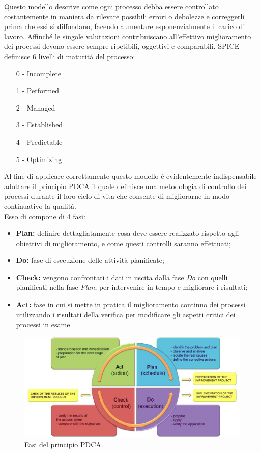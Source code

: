 \documentclass[a4paper]{article}
\begin{document}
				Questo modello descrive come ogni processo debba essere controllato costantemente in maniera da 
				rilevare possibili errori o debolezze e correggerli prima che essi si diffondano, facendo 
				aumentare esponenzialmente il carico di lavoro. Affinché le singole valutazioni contribuiscano 
				all'effettivo miglioramento dei processi devono essere sempre ripetibili, oggettivi e comparabili.
				SPICE definisce 6 livelli di maturità del processo:
				\begin{itemize}
					\item[0] - Incomplete
					\item[1] - Performed
					\item[2] - Managed
					\item[3] - Established
					\item[4] - Predictable
					\item[5] - Optimizing					
				\end{itemize}
				Al fine di applicare correttamente questo modello è evidentemente indispensabile adottare il 
				principio PDCA il quale definisce una metodologia di controllo dei processi durante il loro 
				ciclo di vita che consente di migliorarne in modo continuativo la qualità. \\ 
				Esso di compone di 4 fasi:
				\begin{itemize}
					\item \textbf{Plan:} definire dettagliatamente cosa deve essere realizzato rispetto agli 
					obiettivi di miglioramento, e come questi controlli saranno effettuati;
					\item \textbf{Do:} fase di esecuzione delle attività pianificate;
					\item \textbf{Check:} vengono confrontati i dati in uscita dalla fase \emph{Do} con quelli 
					pianificati nella fase \emph{Plan}, per intervenire in tempo e migliorare i risultati;
					\item \textbf{Act:} fase in cui si mette in pratica il miglioramento continuo dei processi
					 utilizzando i risultati della verifica per modificare gli aspetti critici dei processi in esame.
				\end{itemize}
				\begin{figure}[H]
					\centering
					\includegraphics[scale=0.4]{immagini/Pdq/PDCA.png}
					\caption{Fasi del principio PDCA.}
				\end{figure}
\end{document}
